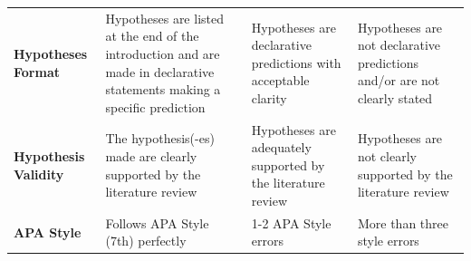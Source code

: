 \documentclass[
  openany]{book}
\begin{document}
\begin{longtable}[]{@{}llll@{}}
\begin{minipage}[t]{0.22\columnwidth}\raggedright
\textbf{Hypotheses Format}\strut
\end{minipage} & \begin{minipage}[t]{0.22\columnwidth}\raggedright
Hypotheses are listed at the end of the introduction and are made in declarative statements making a specific prediction\strut
\end{minipage} & \begin{minipage}[t]{0.22\columnwidth}\raggedright
Hypotheses are declarative predictions with acceptable clarity\strut
\end{minipage} & \begin{minipage}[t]{0.22\columnwidth}\raggedright
Hypotheses are not declarative predictions and/or are not clearly stated\strut
\end{minipage}\tabularnewline
\begin{minipage}[t]{0.22\columnwidth}\raggedright
\textbf{Hypothesis Validity}\strut
\end{minipage} & \begin{minipage}[t]{0.22\columnwidth}\raggedright
The hypothesis(-es) made are clearly supported by the literature review\strut
\end{minipage} & \begin{minipage}[t]{0.22\columnwidth}\raggedright
Hypotheses are adequately supported by the literature review\strut
\end{minipage} & \begin{minipage}[t]{0.22\columnwidth}\raggedright
Hypotheses are not clearly supported by the literature review\strut
\end{minipage}\tabularnewline
\begin{minipage}[t]{0.22\columnwidth}\raggedright
\textbf{APA Style}\strut
\end{minipage} & \begin{minipage}[t]{0.22\columnwidth}\raggedright
Follows APA Style (7th) perfectly\strut
\end{minipage} & \begin{minipage}[t]{0.22\columnwidth}\raggedright
1-2 APA Style errors\strut
\end{minipage} & \begin{minipage}[t]{0.22\columnwidth}\raggedright
More than three style errors\strut
\end{minipage}\tabularnewline
\bottomrule
\end{longtable}
\end{document}
